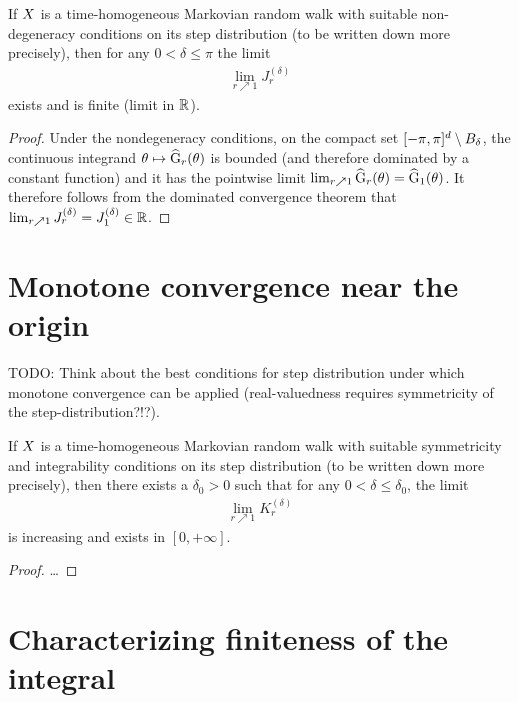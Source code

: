 \begin{lemma}
  \label{lem:integral_away}
  If $X$ is a time-homogeneous Markovian random walk with suitable
  non-degeneracy conditions on its step distribution (to be written down more precisely),
  then for any $0 < \delta \le \pi$ the limit
  \begin{align*}
  \lim_{r \nearrow 1} J_r^{(\delta)}
  \end{align*}
  exists and is finite (limit in $\mathbb{R}$).
\end{lemma}
\begin{proof}
Under the nondegeneracy conditions, on the compact set $[-\pi,\pi]^d \setminus B_\delta$,
the continuous integrand $\theta \mapsto \widehat{\mathrm{G}}_{r}(\theta)$
is bounded (and therefore dominated by a constant function) and
it has the pointwise limit $\lim_{r \nearrow 1} \widehat{\mathrm{G}}_{r}(\theta) = \widehat{\mathrm{G}}_{1}(\theta)$.
It therefore follows from the dominated convergence theorem
that $\lim_{r \nearrow 1} J_r^{(\delta)} = J_1^{(\delta)} \in \mathbb{R}$.
\end{proof}

\section{Monotone convergence near the origin}

TODO: Think about the best conditions for step distribution under which monotone convergence can be applied (real-valuedness requires symmetricity of the step-distribution?!?).

\begin{lemma}
  \label{lem:integral_near}
  If $X$ is a time-homogeneous Markovian random walk with suitable
  symmetricity and integrability conditions on its step distribution (to be written down more precisely),
  then there exists a $\delta_0 > 0$ such that for any $0 < \delta \le \delta_0$, the limit
  \begin{align*}
  \lim_{r \nearrow 1} K_r^{(\delta)}
  \end{align*}
  is increasing and exists in $[0,+\infty]$.
\end{lemma}
\begin{proof}
\ldots
\end{proof}


\section{Characterizing finiteness of the integral}

